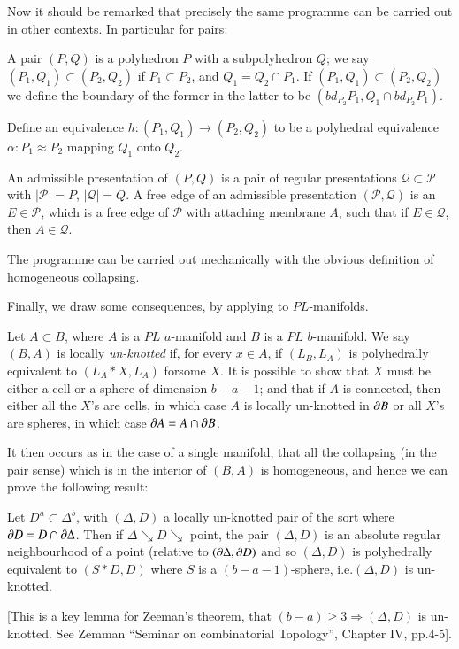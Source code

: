 Now it should be remarked that precisely the same programme can be carried out in other contexts. In particular for pairs:

A pair $(P,Q)$ is a polyhedron $P$ with a subpolyhedron $Q$; we say $(P_{1},Q_{1})\subset (P_{2},Q_{2})$ if $P_{1}\subset P_{2}$, and $Q_{1}=Q_{2}\cap P_{1}$. If $(P_{1},Q_{1})\subset (P_{2},Q_{2})$ we define the boundary of the former in the latter to be $(bd_{P_{2}}P_{1},Q_{1}\cap bd_{P_{2}}P_{1})$.

Define an equivalence $h:(P_{1},Q_{1})\to (P_{2},Q_{2})$ to be a polyhedral equivalence $\alpha:P_{1}\approx P_{2}$ mapping $Q_{1}$ onto $Q_{2}$.

An admissible presentation of $(P,Q)$ is a pair of regular presentations $\mathcal{Q}\subset\mathscr{P}$ with $|\mathscr{P}|=P$, $|\mathcal{Q}|=Q$. A free edge of an admissible presentation $(\mathscr{P},\mathcal{Q})$ is an $E\in \mathscr{P}$, which is a free edge of $\mathscr{P}$ with attaching membrane $A$, such that if $E\in \mathcal{Q}$, then $A\in \mathcal{Q}$.

The programme can be carried out mechanically with the obvious definition of homogeneous collapsing.

Finally, we draw some consequences, by applying to $PL$-manifolds.

Let $A\subset B$, where $A$ is a $PL$ $a$-manifold and $B$ is a $PL$ $b$-manifold. We say $(B,A)$ is locally {\em un-knotted} if, for every $x\in A$, if $(L_{B},L_{A})$ is polyhedrally equivalent to $(L_{A}\ast X,L_{A})$ for\pageoriginale some $X$. It is possible to show that $X$ must be either a cell or a sphere of dimension $b-a-1$; and that if $A$ is connected, then either all the $X$'s are cells, in which case $A$ is locally un-knotted in $\partial B$ or all $X$'s are spheres, in which case $\partial A=A\cap \partial B$.

It then occurs as in the case of a single manifold, that all the collapsing (in the pair sense) which is in the interior of $(B,A)$ is homogeneous, and hence we can prove the following result:

Let $D^{a}\subset \Delta^{b}$, with $(\Delta,D)$ a locally un-knotted pair of the sort where $\partial D=D\cap \partial \Delta$. Then if $\Delta\searrow D\searrow$ point, the pair $(\Delta,D)$ is an absolute regular neighbourhood of a point (relative to $(\partial \Delta,\partial D)$ and so $(\Delta,D)$ is polyhedrally equivalent to $(S\ast D,D)$ where $S$ is a $(b-a-1)$-sphere, i.e.\@ $(\Delta,D)$ is un-knotted.

[This is a key lemma for Zeeman's theorem, that $(b-a)\geq 3\Rightarrow (\Delta,D)$ is un-knotted. See Zemman ``Seminar on combinatorial Topology'', Chapter IV, pp.\@ 4-5]. 






